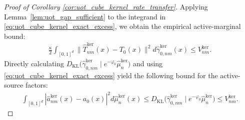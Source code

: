 \documentclass[11pt,reqno]{amsart}
\theoremstyle{definition}
\newcommand{\KL}{\mathrm{KL}}
\renewcommand{\hat}{\widehat}
\begin{document}
\begin{proof}[Proof of Corollary \ref{cor:uot_cube_kernel_rate_transfer}]
Applying Lemma~\ref{lem:uot_gap_sufficient} to the integrand in \eqref{eq:uot_cube_kernel_exact_excess}, we obtain the empirical active-marginal bound:
\begin{align}
\label{eq:uot_cube_kernel_active_marginal_bound}
    \frac{\kappa}{2}
    \int_{[0,1]^d}
    \|\hat T_{nm}^{\mathrm{ker}}(x)-T_0(x)\|^2 d\hat\gamma_{0,nm}^{\mathrm{ker}}(x)
    \le V_{nm}^{\mathrm{ker}}.
\end{align}
Directly calculating ${D_\KL}\bigl(\hat\gamma_{0,nm}^{\mathrm{ker}}\mid e^{-\varphi_0}\hat\mu_n^{\mathrm{ker}}\bigr)$ and using \eqref{eq:uot_cube_kernel_exact_excess} yield the following bound for the active-source factors:
\begin{align}
\label{eq:uot_cube_kernel_active_factor_bound}
    \int_{[0,1]^d}
    |\hat a_{nm}^{\mathrm{ker}}(x)-a_0(x)|^2 d\hat\mu_n^{\mathrm{ker}}(x)
    \le
    {D_\KL}\bigl(\hat\gamma_{0,nm}^{\mathrm{ker}}\mid e^{-\varphi_0}\hat\mu_n^{\mathrm{ker}}\bigr)
    \le V_{nm}^{\mathrm{ker}}.
\end{align}


\end{proof}
\end{document}
